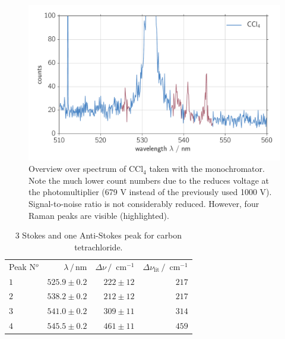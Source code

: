 \begin{figure}[htpb]
    \centering
    \includegraphics[width=0.8\linewidth]{analysis/figures/mono_ccl4}
    \caption{Overview over spectrum of CCl$_4$ taken with the monochromator. Note the much lower count numbers due to 
    the reduces voltage at the photomultiplier (679 V instead of the previously used 1000 V). Signal-to-noise ratio is 
    not considerably reduced. However, four Raman peaks are visible (highlighted). }
    \label{fig:mono_ccl4}
\end{figure}

\begin{table}[htpb]
    \centering
    \caption{
        3 Stokes and one Anti-Stokes peak for carbon tetrachloride. 
        }
    \label{tab:mono_ccl4}
    \begin{tabular}{l r r r}
        \rowcolor{LightCyan} Peak N$^o$ & $\lambda \, / \, \text{nm}$ &
        $\Delta \nu \, / \, \text{ cm}^{-1}$ & 
        $\Delta \nu_\text{lit} \, / \, \text{ cm}^{-1}$ \\
        \cellcolor{LightCyan}$1$ & $525.9 \pm 0.2$ & $222 \pm 12$ & $217$   \\
        \cellcolor{LightCyan}$2$ & $538.2 \pm 0.2$ & $212 \pm 12$ & $217$   \\
        \cellcolor{LightCyan}$3$ & $541.0 \pm 0.2$ & $309 \pm 11$ & $314$   \\
        \cellcolor{LightCyan}$4$ & $545.5 \pm 0.2$ & $461 \pm 11$ & $459$ 
    \end{tabular}
\end{table}



